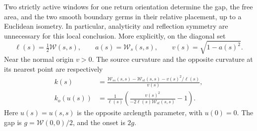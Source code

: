 \begin{theorem}
\label{thm:tw-smooth}
Two strictly active windows for one return orientation determine the
gap, the free area, and the two smooth boundary germs in their relative
placement, up to a Euclidean isometry. In particular, analyticity and
reflection symmetry are unnecessary for this local conclusion.
More explicitly, on the diagonal set
\begin{equation}\label{eq:tw-aux}
 \ell(s)=\tfrac12\mathcal W(s,s),\qquad
 a(s)=\mathcal W_s(s,s),\qquad v(s)=\sqrt{1-a(s)^2}.
\end{equation}
Near the normal origin $v>0$. The source curvature and the opposite
curvature at its nearest point are respectively
\begin{align}
 k(s)&=\frac{\mathcal W_{ss}(s,s)-\mathcal W_{st}(s,s)
                         -v(s)^2/\ell(s)}{v(s)}, \label{eq:tw-sourcecurv}\\
 k_o(u(s))&=\frac1{\ell(s)}
       \left(\frac{v(s)^2}{-2\ell(s)\mathcal W_{st}(s,s)}-1\right).
                                                    \label{eq:tw-othercurv}
\end{align}
Here $u(s)=u(s,s)$ is the opposite arclength parameter, with $u(0)=0$.
The gap is $g=\mathcal W(0,0)/2$, and the onset is $2g$.
\end{theorem}
